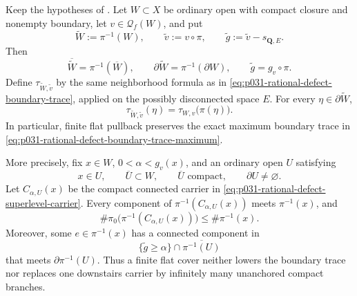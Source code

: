 \begin{corollary}
\label{cor:p031-finite-flat-boundary-trace-and-carrier-anchor}
Keep the hypotheses of
.  Let $W\subset X$ be
ordinary open with compact closure and nonempty boundary, let
$v\in\mathcal Q_f(W)$, and put
\[
 \widetilde W:=\pi^{-1}(W),\qquad
 \widetilde v:=v\circ\pi,\qquad
 \widetilde g:=\widetilde v-s_{\mathbf Q,E}.
\]
Then
\begin{equation}
\label{eq:p031-finite-flat-boundary-pullback}
 \overline{\widetilde W}=\pi^{-1}(\overline W),
 \qquad
 \partial\widetilde W=\pi^{-1}(\partial W),
 \qquad
 \widetilde g=g_v\circ\pi.
\end{equation}
Define $\tau_{\widetilde W,\widetilde v}$ by the same neighborhood
formula as in
\eqref{eq:p031-rational-defect-boundary-trace}, applied on the possibly
disconnected space $E$.  For every $\eta\in\partial\widetilde W$,
\begin{equation}
\label{eq:p031-finite-flat-boundary-trace-pullback}
       \tau_{\widetilde W,\widetilde v}(\eta)
          =\tau_{W,v}\bigl(\pi(\eta)\bigr).
\end{equation}
In particular, finite flat pullback preserves the exact maximum boundary
trace in \eqref{eq:p031-rational-defect-boundary-trace-maximum}.

More precisely, fix $x\in W$, $0<\alpha<g_v(x)$, and an ordinary open
$U$ satisfying
\[
 x\in U,\qquad \overline U\subset W,\qquad
 \overline U\text{ compact},\qquad \partial U\ne\varnothing.
\]
Let $C_{\alpha,U}(x)$ be the compact connected carrier in
\eqref{eq:p031-rational-defect-superlevel-carrier}.  Every component of
$\pi^{-1}(C_{\alpha,U}(x))$ meets $\pi^{-1}(x)$, and
\begin{equation}
\label{eq:p031-finite-flat-carrier-branch-bound}
 \#\pi_0\bigl(\pi^{-1}(C_{\alpha,U}(x))\bigr)
       \leq\#\pi^{-1}(x).
\end{equation}
Moreover, some $e\in\pi^{-1}(x)$ has a connected component in
\[
 \{\widetilde g\geq\alpha\}
       \cap\overline{\pi^{-1}(U)}
\]
that meets $\partial\pi^{-1}(U)$.  Thus a finite flat cover neither lowers
the boundary trace nor replaces one downstairs carrier by infinitely many
unanchored compact branches.
\end{corollary}
